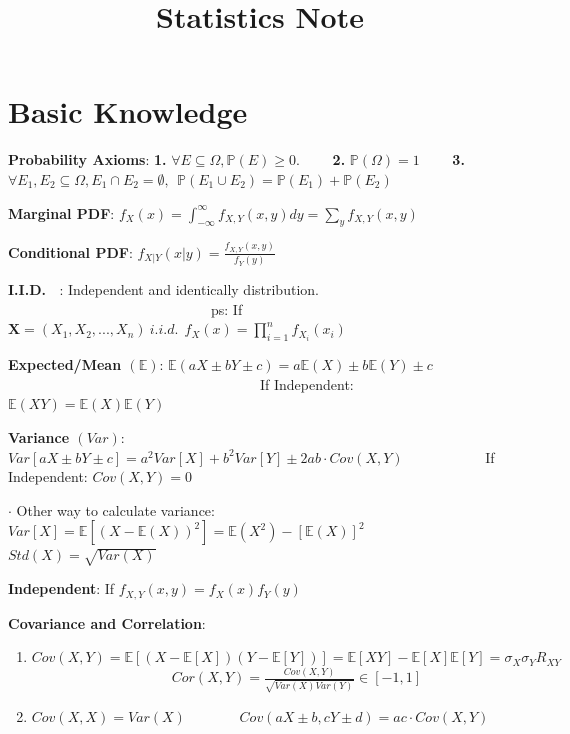 \documentclass[9pt]{article}
\title{Statistics Note}
\author{}
\date{}
\begin{document}
\maketitle
\thispagestyle{fancy}
\vspace{-3.5cm}

\fontsize{10pt}{11pt}\selectfont
\setlength{\parindent}{8pt}

\section{Basic Knowledge} %

\textbf{Probability Axioms}: \textbf{1.} $\forall E\subseteq\Omega,\mathbb{P}(E)\geq 0.$ \ \ \ \ \textbf{2.} $\mathbb{P}(\Omega)=1$ \ \ \ \ \textbf{3.} $\forall E_1,E_2\subseteq\Omega,E_1\cap E_2 =\emptyset, \ \ \mathbb{P}(E_1\cup E_2)=\mathbb{P}(E_1) + \mathbb{P}(E_2)$

\textbf{Marginal PDF}: $f_X(x)=\int^\infty_{-\infty}f_{X,Y}(x,y)dy=\sum_yf_{X,Y}(x,y)$

\textbf{Conditional PDF}: $f_{X|Y}(x|y)=\frac{f_{X,Y}(x,y)}{f_Y(y)}$

\textbf{I.I.D. \ }: Independent and identically distribution. \ \ \ \ \ \ \ \ \ \ \ \ \ \ \ \ \ \ \ \ \ \ \ \ \ \ \ \ \ ps: If $\mathbf{X}=(X_1,X_2,...,X_n) \ i.i.d. \ \ f_X(x)=\prod_{i=1}^{n}f_{X_i}(x_i)$

\textbf{Expected/Mean $(\mathbb{E})$}: $\mathbb{E}(aX\pm bY\pm c)=a\mathbb{E}(X)\pm b\mathbb{E}(Y)\pm c$ \ \ \ \ \ \ \ \ \ \ \ \ \ \ \ \ \ \ \ \ \ \ \ \ \ \ \ \ \ \ \ \ \ \ \ \ If Independent: $\mathbb{E}(XY)=\mathbb{E}(X)\mathbb{E}(Y)$

\textbf{Variance $(Var)$}: $Var[aX\pm bY\pm c]=a^2Var[X]+b^2Var[Y]\pm 2ab\cdot Cov(X,Y)$ \ \ \ \ \ \ \ \ \ \ \ If Independent: $Cov(X,Y)=0$

$\cdot$ Other way to calculate variance: $Var[X]=\mathbb{E}[(X-\mathbb{E}(X))^2]=\mathbb{E}(X^2)-[\mathbb{E}(X)]^2$ \ \ \ \ \ \ \ $Std(X)=\sqrt{Var(X)}$

\textbf{Independent}: If $f_{X,Y}(x,y)=f_X(x)f_Y(y)$

\textbf{Covariance and Correlation}:
\begin{enumerate}[itemsep=-2pt, topsep=-2pt]
    \item $Cov(X,Y)=\mathbb{E}[(X-\mathbb{E}[X])(Y-\mathbb{E}[Y])]=\mathbb{E}[XY]-\mathbb{E}[X]\mathbb{E}[Y]=\sigma_X\sigma_YR_{XY}$ \ \ \ \ \ \ \ \ \ \ \ \ \ \ \ \ \ \ \ \ $Cor(X,Y)=\frac{Cov(X,Y)}{\sqrt{Var(X)Var(Y)}}\in[-1,1]$
    \item $Cov(X,X)=Var(X)$ \ \ \ \  \ \ \ $Cov(aX\pm b,cY\pm d)=ac\cdot Cov(X,Y)$
\end{enumerate}
\end{document}
